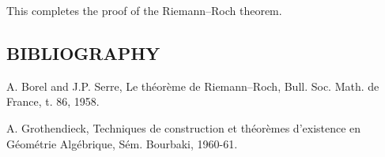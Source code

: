 This completes the proof of the Riemann--Roch theorem.

\subsection*{BIBLIOGRAPHY}
\begin{enumerate}[label={[\arabic*]}]
\item A. Borel and J.P. Serre, Le théorème de Riemann--Roch, Bull. Soc. Math. de France, t. 86, 1958.
\item A. Grothendieck, Techniques de construction et théorèmes d'existence en Géométrie Algébrique, Sém. Bourbaki, 1960-61.
\end{enumerate}
